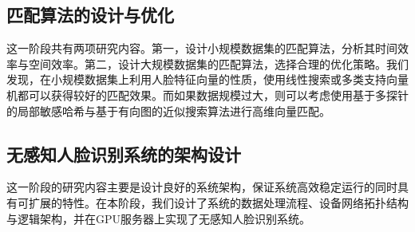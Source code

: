 \subsection{匹配算法的设计与优化}

这一阶段共有两项研究内容。第一，设计小规模数据集的匹配算法，分析其时间效率与空间效率。第二，设计大规模数据集的匹配算法，选择合理的优化策略。我们发现，在小规模数据集上利用人脸特征向量的性质，使用线性搜索或多类支持向量机都可以获得较好的匹配效果。而如果数据规模过大，则可以考虑使用基于多探针的局部敏感哈希与基于有向图的近似搜索算法进行高维向量匹配。

\subsection{无感知人脸识别系统的架构设计}

这一阶段的研究内容主要是设计良好的系统架构，保证系统高效稳定运行的同时具有可扩展的特性。在本阶段，我们设计了系统的数据处理流程、设备网络拓扑结构与逻辑架构，并在GPU服务器上实现了无感知人脸识别系统。
